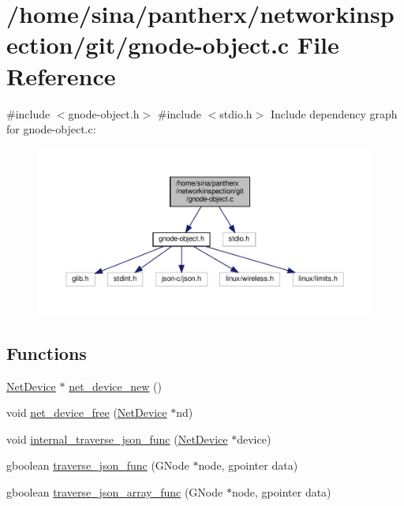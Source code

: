\hypertarget{gnode-object_8c}{}\section{/home/sina/pantherx/networkinspection/git/gnode-\/object.c File Reference}
\label{gnode-object_8c}
{\ttfamily \#include $<$gnode-\/object.\+h$>$}\newline
{\ttfamily \#include $<$stdio.\+h$>$}\newline
Include dependency graph for gnode-\/object.c\+:\nopagebreak
\begin{figure}[H]
\begin{center}
\leavevmode
\includegraphics[width=350pt]{gnode-object_8c__incl}
\end{center}
\end{figure}
\subsection*{Functions}
\begin{DoxyCompactItemize}
\item 
\hyperlink{gnode-object_8h_ab9c23d3a2ba4d9157b5ab053f61388dc}{Net\+Device} $\ast$ \hyperlink{gnode-object_8c_ae666b3f20895e60917e691c81d464235}{net\+\_\+device\+\_\+new} ()
\item 
void \hyperlink{gnode-object_8c_af75477fcbe781bc0b17c75c1ad6d1606}{net\+\_\+device\+\_\+free} (\hyperlink{gnode-object_8h_ab9c23d3a2ba4d9157b5ab053f61388dc}{Net\+Device} $\ast$nd)
\item 
void \hyperlink{gnode-object_8c_a37bf3d0e5222ef4eeda3b40df60a1812}{internal\+\_\+traverse\+\_\+json\+\_\+func} (\hyperlink{gnode-object_8h_ab9c23d3a2ba4d9157b5ab053f61388dc}{Net\+Device} $\ast$device)
\item 
gboolean \hyperlink{gnode-object_8c_acde5d3e413f355d1b912f0dcb9d4cdc1}{traverse\+\_\+json\+\_\+func} (G\+Node $\ast$node, gpointer data)
\item 
gboolean \hyperlink{gnode-object_8c_a0d906716c0b2c59e34bff01153dc23d2}{traverse\+\_\+json\+\_\+array\+\_\+func} (G\+Node $\ast$node, gpointer data)
\end{DoxyCompactItemize}


